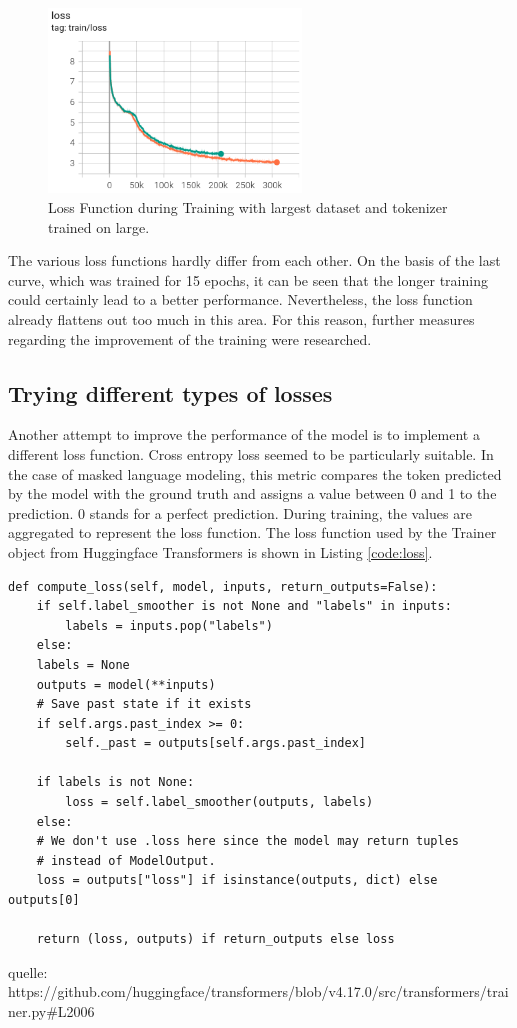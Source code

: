 \begin{figure}[H]
	\centering
	\includegraphics[width=0.6\textwidth]{figures/loss_infs2_large.png}
	\caption{Loss Function during Training with largest dataset and tokenizer trained on large.}
	\label{fig:loss_large_large}
\end{figure}


The various loss functions hardly differ from each other. On the basis of the last curve, which was trained for 15 epochs, it can be seen that the longer training could certainly lead to a better performance. Nevertheless, the loss function already flattens out too much in this area. For this reason, further \alert{ measures} regarding the improvement of the training were researched.

\subsection{Trying different types of losses}
Another attempt to improve the performance of the model is to implement a different loss function. Cross entropy loss seemed to be particularly suitable. In the case of masked language modeling, this metric compares the token predicted by the model with the ground truth and assigns a value between 0 and 1 to the prediction. 0 stands for a perfect prediction. During training, the values are aggregated to represent the loss function. \newline
The loss function used by the \alert{Trainer object from Huggingface Transformers} is shown in Listing \ref{code:loss}.

\begin{code}
	\label{code:loss}
\begin{verbatim}
def compute_loss(self, model, inputs, return_outputs=False):
	if self.label_smoother is not None and "labels" in inputs:
		labels = inputs.pop("labels")
	else:
	labels = None
	outputs = model(**inputs)
	# Save past state if it exists
	if self.args.past_index >= 0:
		self._past = outputs[self.args.past_index]
	
	if labels is not None:
		loss = self.label_smoother(outputs, labels)
	else:
	# We don't use .loss here since the model may return tuples 
	# instead of ModelOutput.
	loss = outputs["loss"] if isinstance(outputs, dict) else outputs[0]
	
	return (loss, outputs) if return_outputs else loss
\end{verbatim}
\end{code}
\alert{quelle: https://github.com/huggingface/transformers/blob/v4.17.0/src/transformers/trainer.py#L2006}

